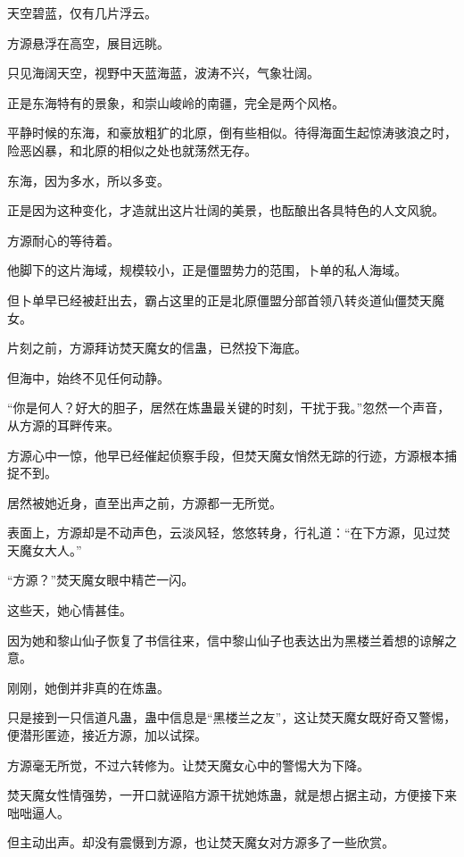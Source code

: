 
\begin{this_body}



天空碧蓝，仅有几片浮云。

方源悬浮在高空，展目远眺。

只见海阔天空，视野中天蓝海蓝，波涛不兴，气象壮阔。

正是东海特有的景象，和崇山峻岭的南疆，完全是两个风格。

平静时候的东海，和豪放粗犷的北原，倒有些相似。待得海面生起惊涛骇浪之时，险恶凶暴，和北原的相似之处也就荡然无存。

东海，因为多水，所以多变。

正是因为这种变化，才造就出这片壮阔的美景，也酝酿出各具特色的人文风貌。

方源耐心的等待着。

他脚下的这片海域，规模较小，正是僵盟势力的范围，卜单的私人海域。

但卜单早已经被赶出去，霸占这里的正是北原僵盟分部首领八转炎道仙僵焚天魔女。

片刻之前，方源拜访焚天魔女的信蛊，已然投下海底。

但海中，始终不见任何动静。

“你是何人？好大的胆子，居然在炼蛊最关键的时刻，干扰于我。”忽然一个声音，从方源的耳畔传来。

方源心中一惊，他早已经催起侦察手段，但焚天魔女悄然无踪的行迹，方源根本捕捉不到。

居然被她近身，直至出声之前，方源都一无所觉。

表面上，方源却是不动声色，云淡风轻，悠悠转身，行礼道：“在下方源，见过焚天魔女大人。”

“方源？”焚天魔女眼中精芒一闪。

这些天，她心情甚佳。

因为她和黎山仙子恢复了书信往来，信中黎山仙子也表达出为黑楼兰着想的谅解之意。

刚刚，她倒并非真的在炼蛊。

只是接到一只信道凡蛊，蛊中信息是“黑楼兰之友”，这让焚天魔女既好奇又警惕，便潜形匿迹，接近方源，加以试探。

方源毫无所觉，不过六转修为。让焚天魔女心中的警惕大为下降。

焚天魔女性情强势，一开口就诬陷方源干扰她炼蛊，就是想占据主动，方便接下来咄咄逼人。

但主动出声。却没有震慑到方源，也让焚天魔女对方源多了一些欣赏。


\end{this_body}
